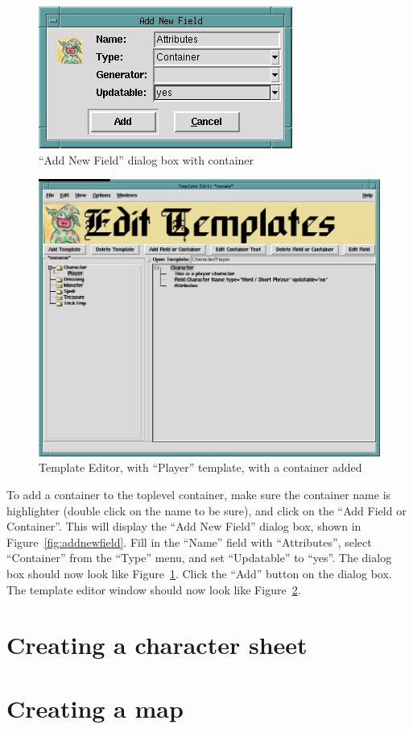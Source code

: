 \begin{figure}[hbpt]
\begin{centering}
\includegraphics{AddNewFieldDialogWithContainer.png}
\caption{``Add New Field'' dialog box with container}
\label{fig:addnewcontainer}
\end{centering}
\end{figure}
\begin{figure}[hbpt]
\begin{centering}
\includegraphics[width=5in]{PlayerTemplateEditorWithContainer.png}
\caption{Template Editor, with ``Player'' template, with a container added}
\label{fig:playertemplateeditorwithcontainer}
\end{centering}
\end{figure}
To add a container to the toplevel container, make sure the container name
is highlighter (double click on the name to be sure), and click on the ``Add
Field or Container''.  This will display the ``Add New Field'' dialog
box, shown in Figure~\ref{fig:addnewfield}.  Fill in the ``Name'' field
with ``Attributes'', select ``Container'' from the
``Type'' menu, and set ``Updatable'' to ``yes''.  The dialog box should
now look like Figure~\ref{fig:addnewcontainer}.  Click the ``Add''
button on the dialog box.  The template editor window should now look
like Figure~\ref{fig:playertemplateeditorwithcontainer}.

\section{Creating a character sheet}


\section{Creating a map}



